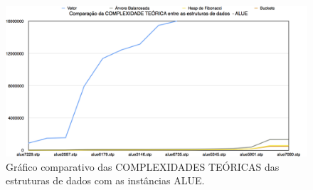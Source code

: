 \documentclass[
	12pt,				%
	oneside,			%
	a4paper,			%
	english,			%
	french,				%
	spanish,			%
	brazil,				%
	]{abntex2}
\begin{document}
\begin{figure}[H]
 \centering
 \includegraphics[width=6.4in]{charts/comp_teoria_alue.png}
 \caption{Gráfico comparativo das COMPLEXIDADES TEÓRICAS das estruturas de dados com as instâncias ALUE.}
 \label{fig:AlueGraphComplex}
\end{figure}
\end{document}
